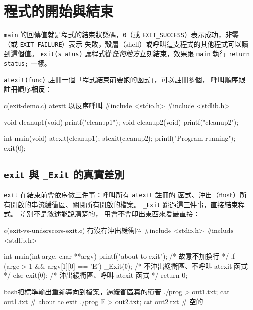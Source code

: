 \section{程式的開始與結束}
\label{sec:sl-startend}

\texttt{main} 的回傳值就是程式的結束狀態碼，\texttt{0}（或
\texttt{EXIT\_SUCCESS}）表示成功，非零（或 \texttt{EXIT\_FAILURE}）表示
失敗，殼層（shell）或呼叫這支程式的其他程式可以讀到這個值。
\texttt{exit(status)} 讓程式從\textit{任何地方}立刻結束，效果跟
\texttt{main} 執行 \texttt{return status;} 一樣。

\texttt{atexit(func)} 註冊一個「程式結束前要跑的函式」，可以註冊多個，
呼叫順序跟註冊順序\textbf{相反}：

\begin{example}{c}{(exit-demo.c) atexit 以反序呼叫}
#include <stdio.h>
#include <stdlib.h>

void cleanup1(void) { printf("cleanup1\n"); }
void cleanup2(void) { printf("cleanup2\n"); }

int main(void) {
    atexit(cleanup1);
    atexit(cleanup2);
    printf("Program running\n");
    exit(0);
}
\end{example}


\subsection{\texttt{exit} 與 \texttt{\_Exit} 的真實差別}

\texttt{exit} 在結束前會依序做三件事：呼叫所有 \texttt{atexit} 註冊的
函式、沖出（flush）所有開啟的串流緩衝區、關閉所有開啟的檔案。
\texttt{\_Exit} 跳過這三件事，直接結束程式。 差別不是敘述能說清楚的，
用會不會印出東西來看最直接：

\begin{example}{c}{(exit-vs-underscore-exit.c) 有沒有沖出緩衝區}
#include <stdio.h>
#include <stdlib.h>

int main(int argc, char **argv) {
    printf("about to exit"); /* 故意不加換行 */
    if (argc > 1 && argv[1][0] == 'E') {
        _Exit(0); /* 不沖出緩衝區、不呼叫 atexit 函式 */
    } else {
        exit(0); /* 沖出緩衝區、呼叫 atexit 函式 */
    }
    return 0;
}
\end{example}

\begin{code}{bash}{把標準輸出重新導向到檔案，逼緩衝區真的積著}
./prog > out1.txt; cat out1.txt      # about to exit
./prog E > out2.txt; cat out2.txt    # 空的
\end{code}

